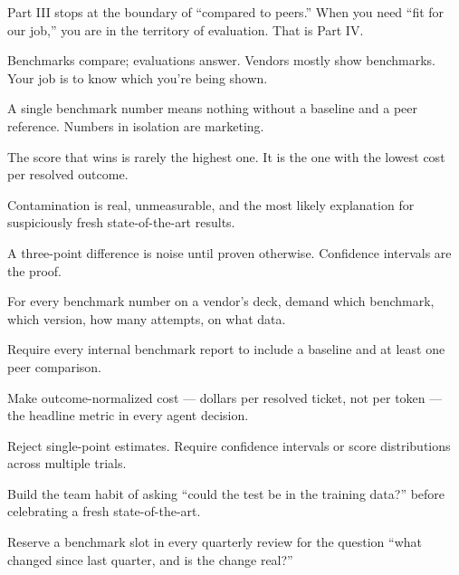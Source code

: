 Part III stops at the boundary of ``compared to peers.'' When you need ``fit for our job,'' you are in the territory of evaluation. That is Part IV.

\TNrule

\stoptwocol

\begin{TNkeytakeaways}
\item Benchmarks compare; evaluations answer. Vendors mostly show benchmarks. Your job is to know which you're being shown.
\item A single benchmark number means nothing without a baseline and a peer reference. Numbers in isolation are marketing.
\item The score that wins is rarely the highest one. It is the one with the lowest cost per resolved outcome.
\item Contamination is real, unmeasurable, and the most likely explanation for suspiciously fresh state-of-the-art results.
\item A three-point difference is noise until proven otherwise. Confidence intervals are the proof.
\end{TNkeytakeaways}

\begin{TNchecklist}
\item For every benchmark number on a vendor's deck, demand which benchmark, which version, how many attempts, on what data.
\item Require every internal benchmark report to include a baseline and at least one peer comparison.
\item Make outcome-normalized cost --- dollars per resolved ticket, not per token --- the headline metric in every agent decision.
\item Reject single-point estimates. Require confidence intervals or score distributions across multiple trials.
\item Build the team habit of asking ``could the test be in the training data?'' before celebrating a fresh state-of-the-art.
\item Reserve a benchmark slot in every quarterly review for the question ``what changed since last quarter, and is the change real?''
\end{TNchecklist}



